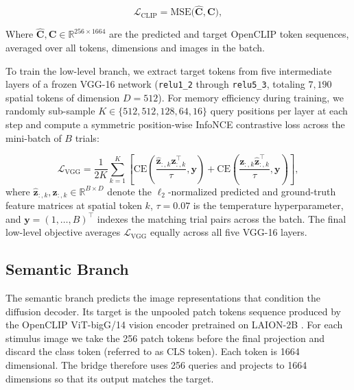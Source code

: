 \begin{equation}
\mathcal{L}_{\mathrm{CLIP}} = \mathrm{MSE}\big(\hat{\mathbf{C}}, \mathbf{C}\big),
\end{equation}

\medskip

Where $\hat{\mathbf{C}}, \mathbf{C} \in \mathbb{R}^{256 \times 1664}$ are the predicted and target OpenCLIP token sequences, averaged over all tokens, dimensions and images in the batch.

To train the low-level branch, we extract target tokens from five intermediate layers of a frozen VGG-16 network (\texttt{relu1\_2} through \texttt{relu5\_3}, totaling $7{,}190$ spatial tokens of dimension $D=512$). For memory efficiency during training, we randomly sub-sample $K\in \{512, 512, 128, 64, 16\}$ query positions per layer at each step and compute a symmetric position-wise InfoNCE contrastive loss across the mini-batch of $B$ trials:

\begin{equation}
\mathcal{L}_{\mathrm{VGG}} =
\frac{1}{2K}\sum_{k=1}^{K}\left[\mathrm{CE}\!\left({\scriptstyle
\frac{\hat{\mathbf{z}}_{:,k}\mathbf{z}_{:,k}^{\top}}{\tau}},
\mathbf{y}\right) + \mathrm{CE}\!\left({\scriptstyle \frac{\mathbf{z}_{:,
k}\hat{\mathbf{z}}_{:,k}^{\top}}{\tau}}, \mathbf{y}\right)\right],
\end{equation}
where $\hat{\mathbf{z}}_{:,k}, \mathbf{z}_{:,k} \in \mathbb{R}^{B \times
D}$ denote the $\ell_2$-normalized predicted and ground-truth feature
matrices at spatial token $k$, $\tau = 0.07$ is the temperature
hyperparameter, and $\mathbf{y} = (1, \dots, B)^{\top}$ indexes the
matching trial pairs across the batch. The final low-level objective
averages $\mathcal{L}_{\mathrm{VGG}}$ equally across all five VGG-16 layers.

\subsection{Semantic Branch}
The semantic branch predicts the image representations that condition the diffusion decoder. Its target is the unpooled patch tokens sequence produced by the OpenCLIP ViT-bigG/14 vision encoder pretrained on LAION-2B \cite{schuhmann2022laionb}. For each stimulus image we take the 256 patch tokens before the final projection and discard the class token (referred to as CLS token). Each token is 1664 dimensional. The bridge therefore uses 256 queries and projects to 1664 dimensions so that its output matches the target.


